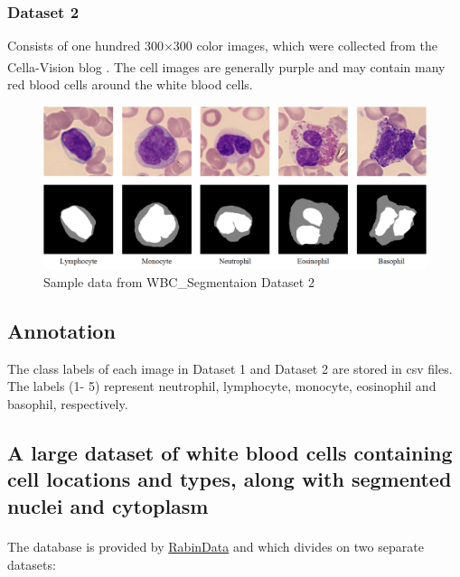 {\subsubsection{Dataset 2}
Consists of one hundred 300×300 color images, which were collected from the Cella-Vision blog \textsuperscript{\cite{2022_cellavision}}. The cell images are generally purple and may contain many red blood cells around the white blood cells.

\begin{figure}[H]
\centering
\includegraphics[width=5.2in]{../images/WBC_Dataset2.png}
\caption{Sample data from WBC\_Segmentaion Dataset 2}
\label{fig:WBC_Dataset2_sample}
\end{figure}

\subsection{Annotation}
\hspace{\parindent}
The class labels of each image in Dataset 1 and Dataset 2 are stored in csv files. The labels (1- 5) represent neutrophil, lymphocyte, monocyte, eosinophil and basophil, respectively.


\subsection{A large dataset of white blood cells containing cell locations and types, along with segmented nuclei and cytoplasm}
\hspace{\parindent}
The database is provided by \href{https://raabindata.com/free-data/#double-labeled-cropped-cells}{RabinData} and \textsuperscript{\cite{Kouzehkanan2022}} which divides on two separate datasets:

}
